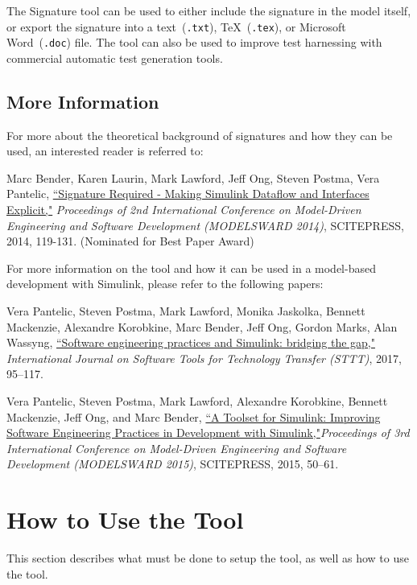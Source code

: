 \documentclass{article}
\makeatletter
\newcommand{\ToolName}{Signature\@\xspace}
\makeatother
\begin{document}
The \ToolName tool can be used to either include the signature in the model itself, or export the signature into a text~(\texttt{.txt}), \TeX~(\texttt{.tex}), or Microsoft Word~(\texttt{.doc}) file. The tool can also be used to improve test harnessing with commercial automatic test generation tools.

\subsection{More Information}
For more about the theoretical background of signatures and how they can be used, an interested reader is referred to:

Marc Bender, Karen Laurin, Mark Lawford, Jeff Ong, Steven Postma, Vera Pantelic, \href{http://www.cas.mcmaster.ca/~lawford/papers/MODELSWARD2014.pdf}{``Signature Required - Making Simulink Dataflow and Interfaces Explicit,"} \textit{Proceedings of 2nd International Conference on Model-Driven Engineering and Software Development (MODELSWARD 2014)}, SCITEPRESS, 2014, 119-131. (Nominated for Best Paper Award)

\vspace{1em}
For more information on the tool and how it can be used in a model-based development with Simulink, please refer to the following papers:

\vspace{1em}
Vera Pantelic, Steven Postma, Mark Lawford, Monika Jaskolka, Bennett Mackenzie, Alexandre Korobkine, Marc Bender, Jeff Ong, Gordon Marks, Alan Wassyng, \href{https://link.springer.com/article/10.1007/s10009-017-0450-9}{``Software engineering practices and Simulink: bridging the gap,"} \textit{International Journal on Software Tools for Technology Transfer (STTT)}, 2017, 95--117.

\vspace{1em}
Vera Pantelic, Steven Postma, Mark Lawford, Alexandre Korobkine, Bennett Mackenzie, Jeff Ong, and Marc Bender, \href{http://www.cas.mcmaster.ca/~lawford/papers/MODELSWARD2015.pdf}{``A Toolset for Simulink: Improving Software Engineering Practices in Development with Simulink,"}\textit{Proceedings of 3rd International Conference on Model-Driven Engineering and Software Development (MODELSWARD 2015)}, SCITEPRESS, 2015, 50--61.

\newpage	
\section{How to Use the Tool}
This section describes what must be done to setup the tool, as well as how to use the tool.
\end{document}
